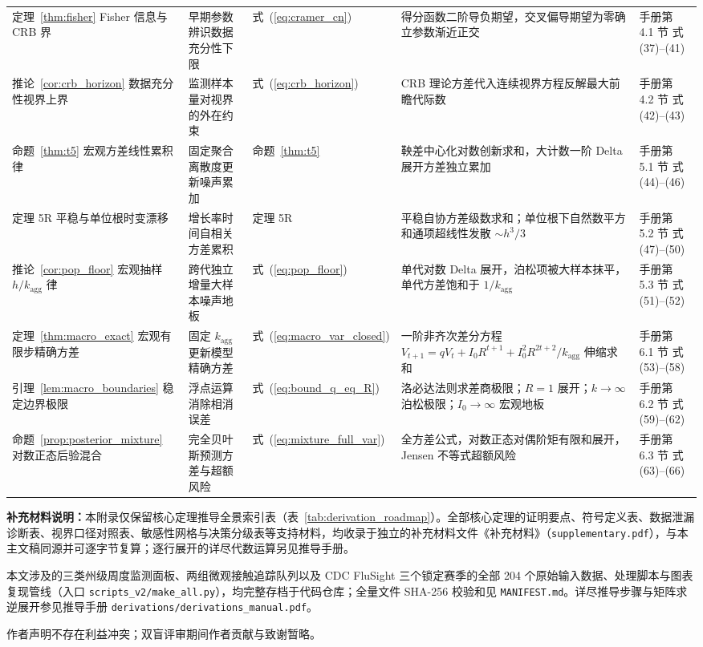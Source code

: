 \documentclass[11pt,a4paper]{article}
\theoremstyle{plain}
\theoremstyle{definition}
\begin{document}
\begin{table}[htbp]
{\begin{tabular}{@{}>{\raggedright\arraybackslash}p{2.6cm}>{\raggedright\arraybackslash}p{3.2cm}>{\raggedright\arraybackslash}p{2.0cm}>{\raggedright\arraybackslash}p{4.8cm}>{\raggedright\arraybackslash}p{2.8cm}@{}}
定理~\ref{thm:fisher} Fisher 信息与 CRB 界 & 早期参数辨识数据充分性下限 & 式~(\ref{eq:cramer_cn}) & 得分函数二阶导负期望，交叉偏导期望为零确立参数渐近正交 & 手册第 4.1 节 式 (37)--(41) \\
推论~\ref{cor:crb_horizon} 数据充分性视界上界 & 监测样本量对视界的外在约束 & 式~(\ref{eq:crb_horizon}) & CRB 理论方差代入连续视界方程反解最大前瞻代际数 & 手册第 4.2 节 式 (42)--(43) \\
命题~\ref{thm:t5} 宏观方差线性累积律 & 固定聚合离散度更新噪声累加 & 命题~\ref{thm:t5} & 鞅差中心化对数创新求和，大计数一阶 Delta 展开方差独立累加 & 手册第 5.1 节 式 (44)--(46) \\
定理 5R 平稳与单位根时变漂移 & 增长率时间自相关方差累积 & 定理 5R & 平稳自协方差级数求和；单位根下自然数平方和通项超线性发散 $\sim h^3/3$ & 手册第 5.2 节 式 (47)--(50) \\
推论~\ref{cor:pop_floor} 宏观抽样 $h/k_{\text{agg}}$ 律 & 跨代独立增量大样本噪声地板 & 式~(\ref{eq:pop_floor}) & 单代对数 Delta 展开，泊松项被大样本抹平，单代方差饱和于 $1/k_{\text{agg}}$ & 手册第 5.3 节 式 (51)--(52) \\
定理~\ref{thm:macro_exact} 宏观有限步精确方差 & 固定 $k_{\text{agg}}$ 更新模型精确方差 & 式~(\ref{eq:macro_var_closed}) & 一阶非齐次差分方程 $V_{t+1}=qV_t+I_0R^{t+1}+I_0^2R^{2t+2}/k_{\text{agg}}$ 伸缩求和 & 手册第 6.1 节 式 (53)--(58) \\
引理~\ref{lem:macro_boundaries} 稳定边界极限 & 浮点运算消除相消误差 & 式~(\ref{eq:bound_q_eq_R}) & 洛必达法则求差商极限；$R=1$ 展开；$k\to\infty$ 泊松极限；$I_0\to\infty$ 宏观地板 & 手册第 6.2 节 式 (59)--(62) \\
命题~\ref{prop:posterior_mixture} 对数正态后验混合 & 完全贝叶斯预测方差与超额风险 & 式~(\ref{eq:mixture_full_var}) & 全方差公式，对数正态对偶阶矩有限和展开，Jensen 不等式超额风险 & 手册第 6.3 节 式 (63)--(66) \\
\bottomrule
\end{tabular}%
}
\end{table}

\noindent\textbf{补充材料说明：}本附录仅保留核心定理推导全景索引表（表~\ref{tab:derivation_roadmap}）。全部核心定理的证明要点、符号定义表、数据泄漏诊断表、视界口径对照表、敏感性网格与决策分级表等支持材料，均收录于独立的补充材料文件《补充材料》（\texttt{supplementary.pdf}），与本主文稿同源并可逐字节复算；逐行展开的详尽代数运算另见推导手册。

 本文涉及的三类州级周度监测面板、两组微观接触追踪队列以及 CDC FluSight 三个锁定赛季的全部 204 个原始输入数据、处理脚本与图表复现管线（入口 \texttt{scripts\_v2/make\_all.py}），均完整存档于代码仓库；全量文件 SHA-256 校验和见 \texttt{MANIFEST.md}。详尽推导步骤与矩阵求逆展开参见推导手册 \texttt{derivations/derivations\_manual.pdf}。

\vspace{0.4em}
 作者声明不存在利益冲突；双盲评审期间作者贡献与致谢暂略。

\vspace{1.0em}
{\footnotesize
\setlength{\bibsep}{2.0pt plus 0.5pt minus 0.5pt}

\renewcommand{\refname}{参考文献：}


}
\end{document}
